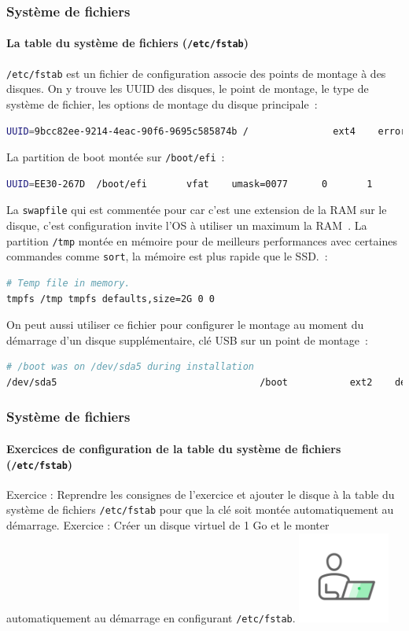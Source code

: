\documentclass{beamer}
\begin{document}
    \begin{frame}[fragile]
        \transdissolve
        \frametitle{Système de fichiers}
        \framesubtitle{La table du système de fichiers (\lstinline{/etc/fstab})}
        \lstinline{/etc/fstab} est un fichier de configuration associe des points de montage à des disques.
        On y trouve les UUID des disques, le point de montage, le type de système de fichier, les options de montage du disque principale~:
        \begin{lstlisting}[language=bash,basicstyle=\tiny\ttfamily]
UUID=9bcc82ee-9214-4eac-90f6-9695c585874b /               ext4    errors=remount-ro 0       1
        \end{lstlisting}
        La partition de boot montée sur \lstinline{/boot/efi}~:
        \begin{lstlisting}[language=bash,basicstyle=\tiny\ttfamily]
UUID=EE30-267D  /boot/efi       vfat    umask=0077      0       1
        \end{lstlisting}
        La \lstinline{swapfile} qui est commentée pour car c'est une extension de la RAM sur le disque, c'est configuration invite l'OS à utiliser un maximum la RAM~.
        La partition \lstinline{/tmp} montée en mémoire pour de meilleurs performances avec certaines commandes comme \lstinline{sort}, la mémoire est plus rapide que le SSD.~:
        \begin{lstlisting}[language=bash,basicstyle=\tiny\ttfamily]
# Temp file in memory.
tmpfs /tmp tmpfs defaults,size=2G 0 0
        \end{lstlisting}
        On peut aussi utiliser ce fichier pour configurer le montage au moment du démarrage d'un disque supplémentaire, clé USB sur un point de montage~:
        \begin{lstlisting}[language=bash,basicstyle=\tiny\ttfamily]
# /boot was on /dev/sda5 during installation
/dev/sda5                                    /boot           ext2    defaults          0       2
        \end{lstlisting}
    \end{frame}

    \begin{frame}
        \transdissolve
        \frametitle{Système de fichiers}
        \framesubtitle{Exercices de configuration de la table du système de fichiers (\lstinline{/etc/fstab})}
        Exercice \execcounterdispinc: Reprendre les consignes de l'exercice  \theexemountcounter{} et ajouter le disque à la table du système de fichiers \lstinline{/etc/fstab} pour que la clé soit montée automatiquement au démarrage.
        \bigbreak
        Exercice \execcounterdispinc: Créer un disque virtuel de 1 Go et le monter automatiquement au démarrage en configurant \lstinline{/etc/fstab}.
        \bigbreak
        \centering
        \includegraphics[width=3cm]{image/guy-in-front-of-desktop}
    \end{frame}
\end{document}
